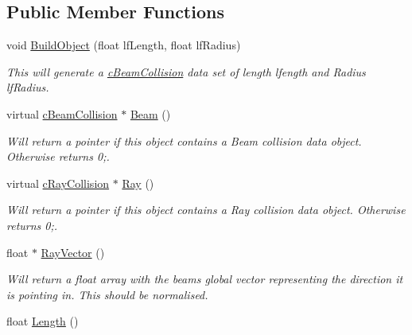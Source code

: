 \subsection*{Public Member Functions}
\begin{DoxyCompactItemize}
\item 
\hypertarget{classc_beam_collision_a8341836a9d69ea56fa119276b6ed29f4}{
void \hyperlink{classc_beam_collision_a8341836a9d69ea56fa119276b6ed29f4}{BuildObject} (float lfLength, float lfRadius)}
\label{classc_beam_collision_a8341836a9d69ea56fa119276b6ed29f4}

\begin{DoxyCompactList}\small\item\em This will generate a \hyperlink{classc_beam_collision}{cBeamCollision} data set of length lfength and Radius lfRadius. \end{DoxyCompactList}\item 
\hypertarget{classc_beam_collision_ae2cb900aab3fc1562c1162e6b5ab98f5}{
virtual \hyperlink{classc_beam_collision}{cBeamCollision} $\ast$ \hyperlink{classc_beam_collision_ae2cb900aab3fc1562c1162e6b5ab98f5}{Beam} ()}
\label{classc_beam_collision_ae2cb900aab3fc1562c1162e6b5ab98f5}

\begin{DoxyCompactList}\small\item\em Will return a pointer if this object contains a Beam collision data object. Otherwise returns 0;. \end{DoxyCompactList}\item 
\hypertarget{classc_beam_collision_a26f8662d41bc325dd14e3be9e7f1d1e9}{
virtual \hyperlink{classc_ray_collision}{cRayCollision} $\ast$ \hyperlink{classc_beam_collision_a26f8662d41bc325dd14e3be9e7f1d1e9}{Ray} ()}
\label{classc_beam_collision_a26f8662d41bc325dd14e3be9e7f1d1e9}

\begin{DoxyCompactList}\small\item\em Will return a pointer if this object contains a Ray collision data object. Otherwise returns 0;. \end{DoxyCompactList}\item 
\hypertarget{classc_beam_collision_a9c4fdda013d88c516edbb470ce9fab01}{
float $\ast$ \hyperlink{classc_beam_collision_a9c4fdda013d88c516edbb470ce9fab01}{RayVector} ()}
\label{classc_beam_collision_a9c4fdda013d88c516edbb470ce9fab01}

\begin{DoxyCompactList}\small\item\em Will return a float array with the beams global vector representing the direction it is pointing in. This should be normalised. \end{DoxyCompactList}\item 
\hypertarget{classc_beam_collision_a2eb26dfd4255ce8a2a10a7b142fb7f42}{
float \hyperlink{classc_beam_collision_a2eb26dfd4255ce8a2a10a7b142fb7f42}{Length} ()}
\label{classc_beam_collision_a2eb26dfd4255ce8a2a10a7b142fb7f42}


\end{DoxyCompactItemize}
